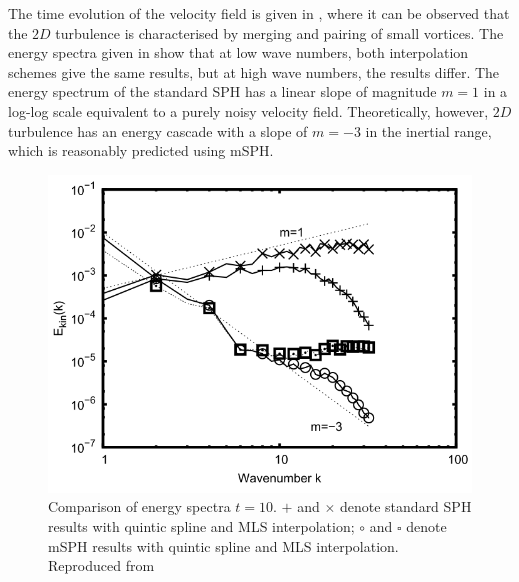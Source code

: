 The time evolution of the velocity field is given in , where it can be observed that the $2D$ turbulence is characterised by merging and pairing of small vortices. The energy spectra given in  show that at low wave numbers, both interpolation schemes give the same results, but at high wave numbers, the results differ. The energy spectrum of the standard SPH has a linear slope of magnitude $m = 1$ in a log-log scale equivalent to a purely noisy velocity field. Theoretically, however, $2D$ turbulence has an energy cascade with a slope of $m = -3$ in the inertial range, which is reasonably predicted using mSPH.
\begin{figure}[H]
    \centering
    \includegraphics[scale=0.55]{Figures/research_papers/adami2012-energy-spectra-tgv.png}
    \caption{Comparison of energy spectra $t=10$. $+$ and $\times$ denote standard SPH results with quintic spline and MLS interpolation; $\circ$ and $\square$ denote mSPH results with quintic spline and MLS interpolation. Reproduced from \cite{Adami2012} }
    \label{fig:adami2012-energy-spectra-tgv}
\end{figure}

